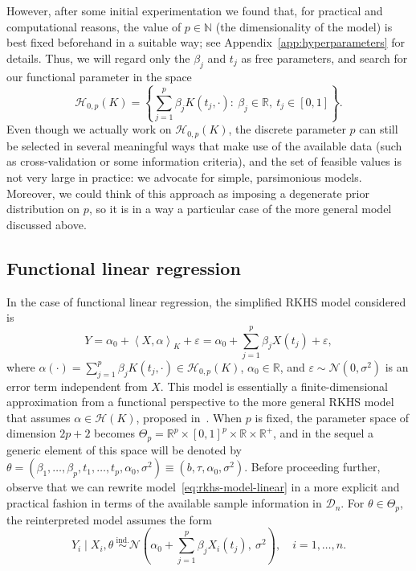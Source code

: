 \documentclass{article}
\numberwithin{equation}{section}
\theoremstyle{plain}
\renewcommand{\epsilon}{\varepsilon}
\newcommand{\N}{\mathbb{N}}
\newcommand{\R}{\mathbb{R}}
\newcommand{\Hcal}{\mathcal{H}}
\newcommand\dotprod[2]{\left\langle#1,#2\right\rangle}
\begin{document}
However, after some initial experimentation we found that, for practical and computational reasons, the value of \(p\in \N\) (the dimensionality of the model) is best fixed beforehand in a suitable way; see Appendix~\ref{app:hyperparameters} for details. Thus, we will regard only the \(\beta_j\) and \(t_j\) as free parameters, and search for our functional parameter in the space
\begin{equation}\label{eq:h0p}
  \Hcal_{0,p}(K)=\left\{ \sum_{j=1}^p \beta_j K(t_j, \cdot): \ \beta_j \in \R, \ t_j \in [0, 1]\right\}.
\end{equation}
Even though we actually work on \(\Hcal_{0,p}(K)\), the discrete parameter \(p\) can still be selected in several meaningful ways that make use of the available data (such as cross-validation or some information criteria), and the set of feasible values is not very large in practice: we advocate for simple, parsimonious models. Moreover, we could think of this approach as imposing a degenerate prior distribution on \(p\), so it is in a way a particular case of the more general model discussed above.

\subsection{Functional linear regression}\label{sec:rkhs-linear-model}

In the case of functional linear regression, the simplified RKHS model considered is
\begin{equation}\label{eq:rkhs-model-linear}
  Y = \alpha_0 + \dotprod{X}{\alpha}_K + \epsilon = \alpha_0 + \sum_{j=1}^p \beta_j X(t_j) + \epsilon,
\end{equation}
where \(\alpha(\cdot)=\sum_{j=1}^p\beta_j K(t_j, \cdot) \in \Hcal_{0,p}(K)\), \(\alpha_0\in\R\), and \(\epsilon \sim \mathcal N(0,\sigma^2)\) is an error term independent from \(X\). This model is essentially a finite-dimensional approximation from a functional perspective to the more general RKHS model that assumes \(\alpha \in \Hcal(K)\), proposed in~\citet{berrendero2019rkhs}. When \(p\) is fixed, the parameter space of dimension \(2p + 2\) becomes \(\Theta_p = \R^p \times [0, 1]^p \times \R \times \R^+\), and in the sequel a generic element of this space will be denoted by \(\theta = (\beta_1,\dots, \beta_p, t_1,\dots, t_p, \alpha_0, \sigma^2) \equiv (b, \tau, \alpha_0, \sigma^2)\). Before proceeding further, observe that we can rewrite model~\eqref{eq:rkhs-model-linear} in a more explicit and practical fashion in terms of the available sample information in \(\mathcal D_n\). For \(\theta \in \Theta_p\), the reinterpreted model assumes the form
\begin{equation}\label{eq:rkhs-model-linear-2}
  Y_i \mid X_i, \theta \ \stackrel{\text{ind.}}{\sim} \mathcal N\left(\alpha_0 + \sum_{j=1}^p \beta_j X_i(t_j), \ \sigma^2\right), \quad i =1,\dots, n.
\end{equation}
\end{document}
